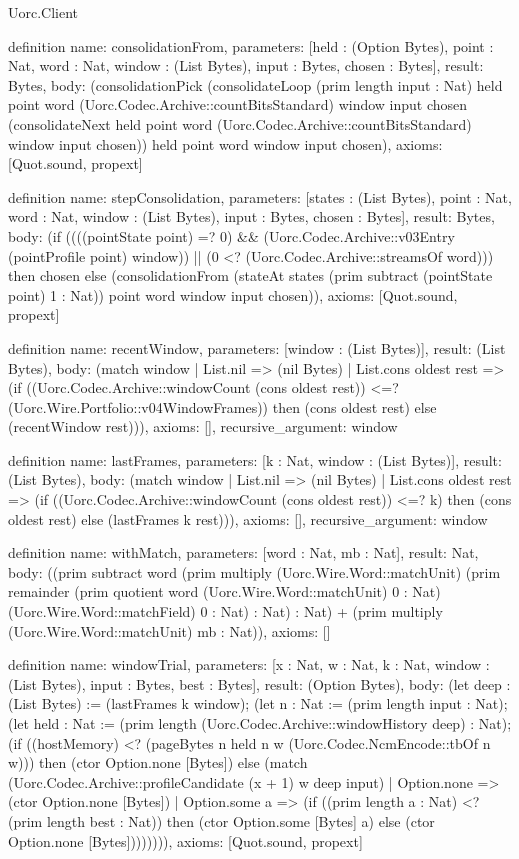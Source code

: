 \begin{lexlean}{Uorc.Client}
\begin{semanticmodule}
definition{
  name: consolidationFrom,
  parameters: [held : (Option Bytes), point : Nat, word : Nat, window : (List Bytes), input : Bytes, chosen : Bytes],
  result: Bytes,
  body: (consolidationPick (consolidateLoop (prim length input : Nat) held point word (Uorc.Codec.Archive::countBitsStandard) window input chosen (consolidateNext held point word (Uorc.Codec.Archive::countBitsStandard) window input chosen)) held point word window input chosen),
  axioms: [Quot.sound, propext]
}

definition{
  name: stepConsolidation,
  parameters: [states : (List Bytes), point : Nat, word : Nat, window : (List Bytes), input : Bytes, chosen : Bytes],
  result: Bytes,
  body: (if ((((pointState point) =? 0) && (Uorc.Codec.Archive::v03Entry (pointProfile point) window)) || (0 <? (Uorc.Codec.Archive::streamsOf word))) then chosen else (consolidationFrom (stateAt states (prim subtract (pointState point) 1 : Nat)) point word window input chosen)),
  axioms: [Quot.sound, propext]
}

definition{
  name: recentWindow,
  parameters: [window : (List Bytes)],
  result: (List Bytes),
  body: (match window
    | List.nil => (nil Bytes)
    | List.cons oldest rest => (if ((Uorc.Codec.Archive::windowCount (cons oldest rest)) <=? (Uorc.Wire.Portfolio::v04WindowFrames)) then (cons oldest rest) else (recentWindow rest))),
  axioms: [],
  recursive_argument: window
}

definition{
  name: lastFrames,
  parameters: [k : Nat, window : (List Bytes)],
  result: (List Bytes),
  body: (match window
    | List.nil => (nil Bytes)
    | List.cons oldest rest => (if ((Uorc.Codec.Archive::windowCount (cons oldest rest)) <=? k) then (cons oldest rest) else (lastFrames k rest))),
  axioms: [],
  recursive_argument: window
}

definition{
  name: withMatch,
  parameters: [word : Nat, mb : Nat],
  result: Nat,
  body: ((prim subtract word (prim multiply (Uorc.Wire.Word::matchUnit) (prim remainder (prim quotient word (Uorc.Wire.Word::matchUnit) 0 : Nat) (Uorc.Wire.Word::matchField) 0 : Nat) : Nat) : Nat) + (prim multiply (Uorc.Wire.Word::matchUnit) mb : Nat)),
  axioms: []
}

definition{
  name: windowTrial,
  parameters: [x : Nat, w : Nat, k : Nat, window : (List Bytes), input : Bytes, best : Bytes],
  result: (Option Bytes),
  body: (let deep : (List Bytes) := (lastFrames k window); (let n : Nat := (prim length input : Nat); (let held : Nat := (prim length (Uorc.Codec.Archive::windowHistory deep) : Nat); (if ((hostMemory) <? (pageBytes n held n w (Uorc.Codec.NcmEncode::tbOf n w))) then (ctor Option.none [Bytes]) else (match (Uorc.Codec.Archive::profileCandidate (x + 1) w deep input)
    | Option.none => (ctor Option.none [Bytes])
    | Option.some a => (if ((prim length a : Nat) <? (prim length best : Nat)) then (ctor Option.some [Bytes] a) else (ctor Option.none [Bytes]))))))),
  axioms: [Quot.sound, propext]
}


\end{semanticmodule}
\end{lexlean}

